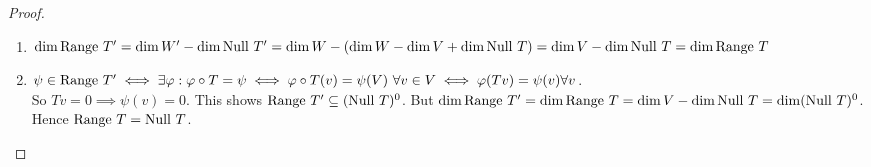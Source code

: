 \begin{proof} $ $
    \begin{enumerate}[label = (\alph*)]
        \item $\dim \text{Range } T' = \dim W' - \dim \text{Null } T' = \dim W - (\dim W - \dim V + \dim \text{Null } T) = \dim V - \dim \text{Null } T = \dim \text{Range } T$
        \item $\psi \in \range T' \iff \exists \varphi : \varphi \circ T = \psi \iff \varphi \circ T(v) = \psi(V) \ \forall v \in V \iff \varphi(Tv) = \psi(v) \forall v$. \\ So $Tv = 0 \implies \psi(v) = 0$. This shows $\text{Range } T' \subseteq (\text{Null } T)^0$. But $\dim \text{Range } T' = \dim \text{Range } T = \dim V - \dim \text{Null } T = \dim (\text{Null } T)^0$. Hence $\text{Range } T = \text{Null } T$.
    \end{enumerate}
\end{proof}
